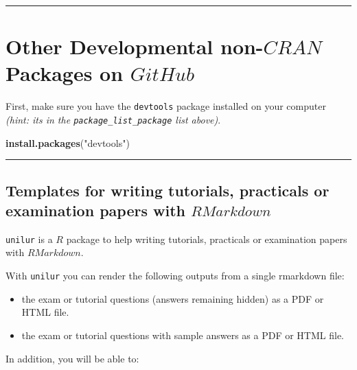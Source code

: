 \documentclass[]{book}
\newenvironment{Shaded}{\begin{snugshade}}{\end{snugshade}}
\newcommand{\KeywordTok}[1]{\textcolor[rgb]{0.13,0.29,0.53}{\textbf{#1}}}
\newcommand{\StringTok}[1]{\textcolor[rgb]{0.31,0.60,0.02}{#1}}
\newcommand{\NormalTok}[1]{#1}
\theoremstyle{definition}
\theoremstyle{definition}
\theoremstyle{definition}
\theoremstyle{remark}
\begin{document}
\begin{center}\rule{0.5\linewidth}{\linethickness}\end{center}

\section{\texorpdfstring{Other Developmental non-\(CRAN\) Packages on
\(GitHub\)}{Other Developmental non-CRAN Packages on GitHub}}\label{other-developmental-non-cran-packages-on-github}

First, make sure you have the \texttt{devtools} package installed on
your computer \emph{(hint: its in the \texttt{package\_list\_package}
list above)}.

\begin{Shaded}
\begin{Highlighting}[]
\KeywordTok{install.packages}\NormalTok{(}\StringTok{"devtools"}\NormalTok{)}
\end{Highlighting}
\end{Shaded}

\begin{center}\rule{0.5\linewidth}{\linethickness}\end{center}

\subsection{\texorpdfstring{Templates for writing tutorials, practicals
or examination papers with
\(R Markdown\)}{Templates for writing tutorials, practicals or examination papers with R Markdown}}\label{templates-for-writing-tutorials-practicals-or-examination-papers-with-r-markdown}

\texttt{unilur} is a \(R\) package to help writing tutorials, practicals
or examination papers with \(R Markdown\).

With \texttt{unilur} you can render the following outputs from a single
rmarkdown file:

\begin{itemize}
\item
  the exam or tutorial questions (answers remaining hidden) as a PDF or
  HTML file.
\item
  the exam or tutorial questions with sample answers as a PDF or HTML
  file.
\end{itemize}

In addition, you will be able to:
\end{document}
